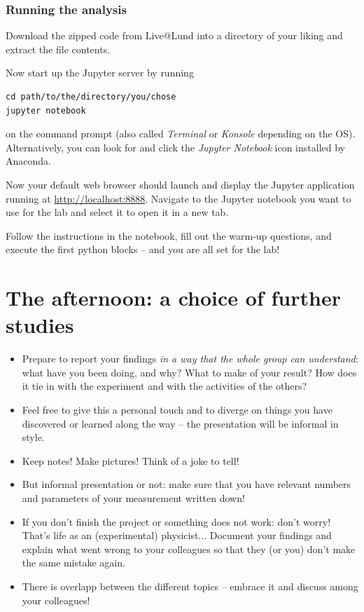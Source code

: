 \documentclass[a4,11pt, notitlepage]{article}
\begin{document}
\subsubsection{Running the analysis}
\label{sec:running-analysis}

Download the zipped code from Live@Lund into a directory
of your liking and extract the file contents.

Now start up the Jupyter server by running
\begin{verbatim}
cd path/to/the/directory/you/chose
jupyter notebook
\end{verbatim}
on the command prompt (also called \emph{Terminal} or \emph{Konsole}
depending on the OS). Alternatively, you can look for and click the \emph{Jupyter Notebook}
icon installed by Anaconda.

Now your default web browser should launch and display the Jupyter application
running at \url{http://localhost:8888}. Navigate to the Jupyter notebook you
want to use for the lab and select it to open it in a new tab.

Follow the instructions in the notebook, fill out the warm-up questions, and
execute the first python blocks -- and you are all set for the lab!


\section{The afternoon: a choice of further studies}
\label{sec:afternoon}

\begin{itemize}
\item Prepare to report your findings \emph{in a way that the
    whole group can understand}: what have you been doing, and why?
  What to make of your result? How does it tie in with the experiment
  and with the activities of the others?
\item Feel free to give this a personal touch and to diverge on things
  you have discovered or learned along the way -- the presentation
  will be informal in style.
\item Keep notes! Make pictures! Think of a joke to tell!
\item But informal presentation or not: make sure that you have
  relevant numbers and parameters of your measurement written down!
\item If you don't finish the project or something does not work:
  don't worry! That's life as an (experimental) physicist... Document
  your findings and explain what went wrong to your colleagues so that
  they (or you) don't make the same mistake again.
\item There is overlapp between the different topics -- embrace it and
  discuss among your colleagues!
\end{itemize}
\end{document}
